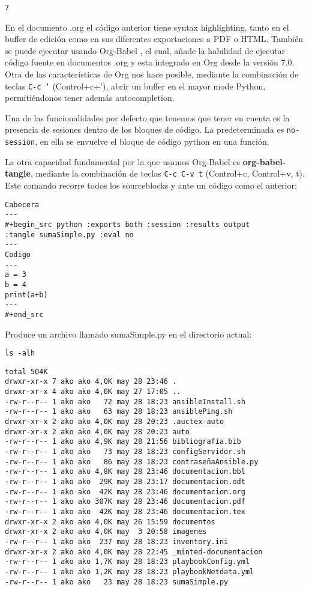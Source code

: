 \documentclass[11pt]{article}
\begin{document}
\begin{verbatim}
7
\end{verbatim}


En el documento .org el código anterior tiene syntax highlighting, tanto en el buffer de edición como en sus diferentes exportaciones a PDF o HTML. También se puede ejecutar usando Org-Babel \cite{schulteorg}, el cual, añade la habilidad de ejecutar código fuente en documentos .org y esta integrado en Org desde la versión 7.0. Otra de las características de Org nos hace posible, mediante la combinación de teclas \texttt{C-c '} (Control+c+'), abrir un buffer en el mayor mode Python, permitiéndonos tener además autocompletion.

Una de las funcionalidades por defecto que tenemos que tener en cuenta es la presencia de sesiones dentro de los bloques de código. La predeterminada es \texttt{no-session}, en ella se envuelve el bloque de código python en una función.

La otra capacidad fundamental por la que usamos Org-Babel es \textbf{org-babel-tangle}, mediante la combinación de teclas \texttt{C-c C-v t} (Control+c, Control+v, t). Este comando recorre todos los sourceblocks y ante un código como el anterior:

\begin{verbatim}
Cabecera
---
#+begin_src python :exports both :session :results output
:tangle sumaSimple.py :eval no
---
Codigo
---
a = 3
b = 4
print(a+b)
---
#+end_src
\end{verbatim}

Produce un archivo llamado sumaSimple.py en el directorio actual:

\begin{verbatim}
ls -alh
\end{verbatim}

\begin{verbatim}
total 504K
drwxr-xr-x 7 ako ako 4,0K may 28 23:46 .
drwxr-xr-x 4 ako ako 4,0K may 27 17:05 ..
-rw-r--r-- 1 ako ako   72 may 28 18:23 ansibleInstall.sh
-rw-r--r-- 1 ako ako   63 may 28 18:23 ansiblePing.sh
drwxr-xr-x 2 ako ako 4,0K may 28 20:23 .auctex-auto
drwxr-xr-x 2 ako ako 4,0K may 28 20:23 auto
-rw-r--r-- 1 ako ako 4,9K may 28 21:56 bibliografía.bib
-rw-r--r-- 1 ako ako   73 may 28 18:23 configServidor.sh
-rw-r--r-- 1 ako ako   86 may 28 18:23 contraseñaAnsible.py
-rw-r--r-- 1 ako ako 4,8K may 28 23:46 documentacion.bbl
-rw-r--r-- 1 ako ako  29K may 28 23:17 documentacion.odt
-rw-r--r-- 1 ako ako  42K may 28 23:46 documentacion.org
-rw-r--r-- 1 ako ako 307K may 28 23:46 documentacion.pdf
-rw-r--r-- 1 ako ako  42K may 28 23:46 documentacion.tex
drwxr-xr-x 2 ako ako 4,0K may 26 15:59 documentos
drwxr-xr-x 2 ako ako 4,0K may  3 20:58 imagenes
-rw-r--r-- 1 ako ako  237 may 28 18:23 inventory.ini
drwxr-xr-x 2 ako ako 4,0K may 28 22:45 _minted-documentacion
-rw-r--r-- 1 ako ako 1,7K may 28 18:23 playbookConfig.yml
-rw-r--r-- 1 ako ako 1,2K may 28 18:23 playbookNetdata.yml
-rw-r--r-- 1 ako ako   23 may 28 18:23 sumaSimple.py
\end{verbatim}
\end{document}
